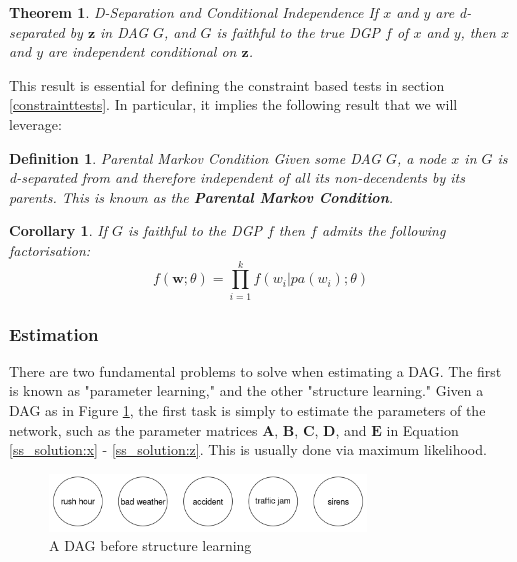 \documentclass{article}
\newtheorem{definition}{Definition}
\newtheorem{corollary}{Corollary}
\newtheorem{theorem}{Theorem}
\begin{document}
\theoremstyle{theorem}
\begin{theorem}{D-Separation and Conditional Independence}
  If $x$ and $y$ are d-separated by $\mathbf{z}$ in DAG $G$, and $G$ is faithful to the true DGP $f$ of $x$ and $y$, then $x$ and $y$ are independent conditional on $\mathbf{z}$. 
  \parencite[p.16]{pearl2009causality}
\end{theorem}

This result is essential for defining the constraint based tests in section \ref{constrainttests}. In particular, it implies the following result that we will leverage:

\theoremstyle{corollary}
\begin{definition}{Parental Markov Condition}
  Given some DAG $G$, a node $x$ in $G$ is d-separated from and therefore independent of all its non-decendents by its parents. This is known as the \textbf{Parental Markov Condition}. 
  \parencite[p.16, p.19]{pearl2009causality}
  \label{markovcompatibility}
\end{definition}

\theoremstyle{corollary}
\begin{corollary}
  If $G$ is faithful to the DGP $f$ then $f$ admits the following factorisation:
  \begin{equation}
    f(\mathbf{w};\theta) = \prod_{i=1}^{k} f(w_i | pa(w_i);\theta)
  \end{equation}
\end{corollary}

\subsubsection{Estimation} \label{dag_estimation}

There are two fundamental problems to solve when estimating a DAG. The first is known as "parameter learning," and the other "structure learning." Given a DAG as in Figure \ref{dag2}, the first task is simply to estimate the parameters of the network, such as the parameter matrices $\mathbf{A}$, $\mathbf{B}$, $\mathbf{C}$, $\mathbf{D}$, and $\mathbf{E}$ in Equation \ref{ss_solution:x} - \ref{ss_solution:z}. This is usually done via maximum likelihood.

\begin{figure}
  \centering
  \includegraphics[width=0.75\textwidth]{images/trafficjam_unfit.png}
  \caption{A DAG before structure learning}
  \label{dag2}
\end{figure}
\end{document}
